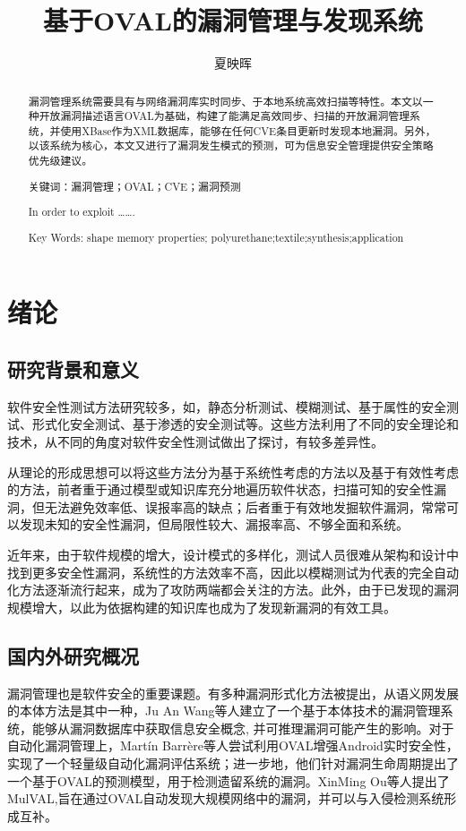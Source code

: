 \documentclass[a4paper]{ctexrep}
\title{基于OVAL的漏洞管理与发现系统}
\author{夏映晖}
\date{}
\begin{document}
	\maketitle
	\begin{abstract}
	漏洞管理系统需要具有与网络漏洞库实时同步、于本地系统高效扫描等特性。本文以一种开放漏洞描述语言OVAL为基础，构建了能满足高效同步、扫描的开放漏洞管理系统，并使用XBase作为XML数据库，能够在任何CVE条目更新时发现本地漏洞。另外，以该系统为核心，本文又进行了漏洞发生模式的预测，可为信息安全管理提供安全策略优先级建议。
	
	关键词：漏洞管理；OVAL；CVE；漏洞预测
	\end{abstract}
	\renewcommand\abstractname{abstract}
	\begin{abstract}
	In order to exploit …….
	
	Key Words: shape memory properties; polyurethane;textile;synthesis;application
	\end{abstract}
	\tableofcontents
	\newpage
	\setcounter{page}{1}
	\chapter{绪论}
		\section{研究背景和意义}
		软件安全性测试方法研究较多，如，静态分析测试\cite{钟永松2007基于}、模糊测试、基于属性的安全测试、形式化安全测试、基于渗透的安全测试等。这些方法利用了不同的安全理论和技术，从不同的角度对软件安全性测试做出了探讨，有较多差异性。
		
		从理论的形成思想可以将这些方法分为基于系统性考虑的方法以及基于有效性考虑的方法，前者重于通过模型或知识库充分地遍历软件状态，扫描可知的安全性漏洞，但无法避免效率低、误报率高的缺点；后者重于有效地发掘软件漏洞，常常可以发现未知的安全性漏洞，但局限性较大、漏报率高、不够全面和系统。

		近年来，由于软件规模的增大，设计模式的多样化，测试人员很难从架构和设计中找到更多安全性漏洞，系统性的方法效率不高，因此以模糊测试为代表的完全自动化方法逐渐流行起来，成为了攻防两端都会关注的方法。此外，由于已发现的漏洞规模增大，以此为依据构建的知识库也成为了发现新漏洞的有效工具。
		\section{国内外研究概况} 
		漏洞管理也是软件安全的重要课题。有多种漏洞形式化方法被提出，从语义网发展的本体方法是其中一种，Ju An Wang\cite{morishita1992activation}等人建立了一个基于本体技术的漏洞管理系统，能够从漏洞数据库中获取信息安全概念, 并可推理漏洞可能产生的影响。对于自动化漏洞管理上，Martín Barrère等人尝试利用OVAL增强Android实时安全性，实现了一个轻量级自动化漏洞评估系统；进一步地，他们针对漏洞生命周期提出了一个基于OVAL的预测模型，用于检测遗留系统的漏洞。XinMing Ou等人提出了MulVAL,旨在通过OVAL自动发现大规模网络中的漏洞，并可以与入侵检测系统形成互补。
\end{document}
